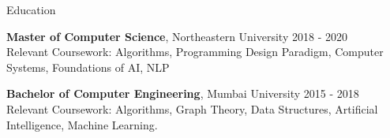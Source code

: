 \documentclass{resume} %
\begin{document}





\begin{rSection}{Education}

{\bf Master of Computer Science}, Northeastern University \hfill {2018 - 2020}\\
Relevant Coursework: Algorithms, Programming Design Paradigm, Computer Systems, Foundations of AI, NLP

{\bf Bachelor of Computer Engineering}, Mumbai University \hfill {2015 - 2018}\\
Relevant Coursework: Algorithms, Graph Theory, Data Structures, Artificial Intelligence, Machine Learning. 



\end{rSection}


\end{document}
